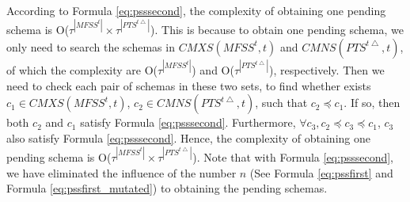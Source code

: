{According to Formula \ref{eq:psssecond}, the complexity of obtaining one pending schema is O($ \tau^{|MFSS^{t}|} \times \tau^{|PTS^{t\bigtriangleup}|}$). This is because to obtain one pending schema, we only need to search the schemas in $CMXS(MFSS^{t}, t)$ and $CMNS(PTS^{t\bigtriangleup}, t)$, of which the complexity are O($\tau^{|MFSS^{t}|}$) and O($\tau^{|PTS^{t\bigtriangleup}|}$), respectively. Then we need to check each pair of schemas in these two sets, to find whether exists $c_{1} \in CMXS(MFSS^{t}, t)$, $c_{2} \in CMNS(PTS^{t\bigtriangleup}, t)$, such that $c_{2} \preceq c_{1}$. If so, then both $c_{2}$ and $c_{1}$ satisfy Formula \ref{eq:psssecond}. Furthermore, $\forall c_{3}, c_{2} \preceq c_{3} \preceq c_{1}$, $c_{3}$ also satisfy Formula \ref{eq:psssecond}. Hence, the complexity of obtaining one pending schema is O($\tau^{|MFSS^{t}|} \times \tau^{|PTS^{t\bigtriangleup}|}$). Note that with Formula \ref{eq:psssecond}, we have eliminated the influence of the number $n$ (See Formula \ref{eq:pssfirst} and Formula \ref{eq:pssfirst_mutated}) to obtaining the pending schemas.
%
%
%
%
%
%
%
%
}
